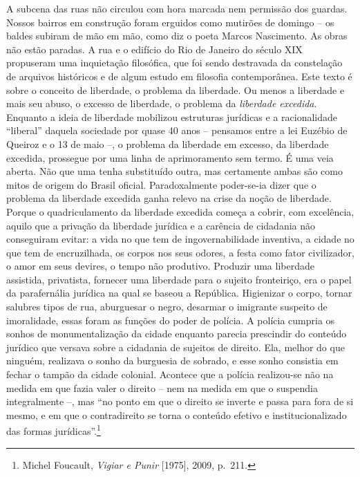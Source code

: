 A subcena das ruas não circulou com hora marcada nem permissão dos
guardas. Nossos bairros em construção foram erguidos como mutirões de
domingo -- os baldes subiram de mão em mão, como diz o poeta Marcos
Nascimento. As obras não estão paradas. A rua e o edifício do Rio de
Janeiro do século XIX propuseram uma inquietação filosófica, que foi
sendo destravada da constelação de arquivos históricos e de algum estudo
em filosofia contemporânea. Este texto é sobre o conceito de liberdade,
o problema da liberdade. Ou menos a liberdade e mais seu abuso, o
excesso de liberdade, o problema da \emph{liberdade excedida}. Enquanto
a ideia de liberdade mobilizou estruturas jurídicas e a racionalidade
``liberal'' daquela sociedade por quase 40 anos -- pensamos entre a lei
Euzébio de Queiroz e o 13 de maio --, o problema da liberdade em
excesso, da liberdade excedida, prossegue por uma linha de aprimoramento
sem termo. É uma veia aberta. Não que uma tenha substituído outra, mas
certamente ambas são como mitos de origem do Brasil oficial.
Paradoxalmente poder-se-ia dizer que o problema da liberdade excedida
ganha relevo na crise da noção de liberdade. Porque o quadriculamento da
liberdade excedida começa a cobrir, com excelência, aquilo que a
privação da liberdade jurídica e a carência de cidadania não conseguiram
evitar: a vida no que tem de ingovernabilidade inventiva, a cidade no
que tem de encruzilhada, os corpos nos seus odores, a festa como fator
civilizador, o amor em seus devires, o tempo não produtivo. Produzir uma
liberdade assistida, privatista, fornecer uma liberdade para o sujeito
fronteiriço, era o papel da parafernália jurídica na qual se baseou a
República. Higienizar o corpo, tornar salubres tipos de rua, aburguesar
o negro, desarmar o imigrante suspeito de imoralidade, essas foram as
funções do poder de polícia. A polícia cumpria os sonhos de
monumentalização da cidade enquanto parecia prescindir do conteúdo
jurídico que versava sobre a cidadania de sujeitos de direito. Ela,
melhor do que ninguém, realizava o sonho da burguesia de sobrado, e esse
sonho consistia em fechar o tampão da cidade colonial. Acontece que a
polícia realizou-se não na medida em que fazia valer o direito -- nem na
medida em que o suspendia integralmente --, mas ``no ponto em que o
direito se inverte e passa para fora de si mesmo, e em que o
contradireito se torna o conteúdo efetivo e institucionalizado das
formas jurídicas''.\footnote{Michel Foucault, \emph{Vigiar e Punir}
  {[}1975{]}, 2009, p.~211.}

